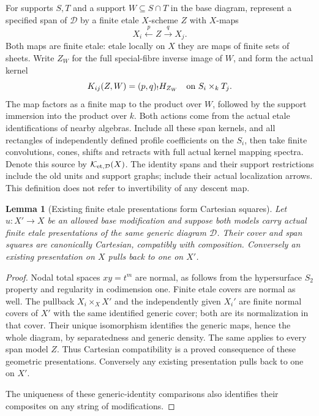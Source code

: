 \documentclass[11pt]{article}
\newtheorem{lemma}[theorem]{Lemma}
\theoremstyle{definition}
\theoremstyle{remark}
\begin{document}
For supports $S,T$ and a support $W\subseteq S\cap T$ in the base
diagram, represent a specified span of $\mathcal D$ by a finite
etale $X$-scheme $Z$ with $X$-maps
\[
 X_i\xleftarrow{p}Z\xrightarrow{q}X_j.
\]
Both maps are finite etale: etale locally on $X$ they are maps of
finite sets of sheets. Write $Z_W$ for the full special-fibre
inverse image of $W$, and form the actual kernel
\[
 K_{ij}(Z,W)=(p,q)_!H_{Z_W}\quad\hbox{on }S_i\times_k T_j.
\]
The map factors as a finite map to the product over $W$, followed
by the support immersion into the product over $k$. Both actions
come from the actual etale identifications of nearby algebras.
Include all these span kernels, and all rectangles of independently
defined profile coefficients on the $S_i$, then take finite
convolutions, cones, shifts and retracts with full actual kernel
mapping spectra. Denote this source by $\mathcal K_{{\rm et},\mathcal D}(X)$.
The identity spans and their support restrictions include the old
units and support graphs; include their actual localization arrows.
This definition does not refer to invertibility of any descent map.

\begin{lemma}[Existing finite etale presentations form Cartesian squares]
\label{lem:etale-cartesian-presentations}
Let $u:X'\to X$ be an allowed base modification and suppose both
models carry actual finite etale presentations of the same generic
diagram $\mathcal D$. Their cover and span squares are canonically
Cartesian, compatibly with composition. Conversely an existing
presentation on $X$ pulls back to one on $X'$.
\end{lemma}
\begin{proof}
Nodal total spaces $xy=t^m$ are
normal, as follows from the hypersurface $S_2$ property and
regularity in codimension one. Finite etale covers are normal as
well. The pullback $X_i\times_X X'$ and the independently given
$X_i'$ are finite normal covers of $X'$ with the same identified
generic cover; both are its normalization in that cover. Their
unique isomorphism identifies the generic maps, hence the whole
diagram, by separatedness and generic density. The same applies
to every span model $Z$. Thus Cartesian compatibility is a proved
consequence of these geometric presentations. Conversely any
existing presentation pulls back to one on $X'$.

The uniqueness of these generic-identity comparisons also identifies
their composites on any string of modifications.
\end{proof}
\end{document}
